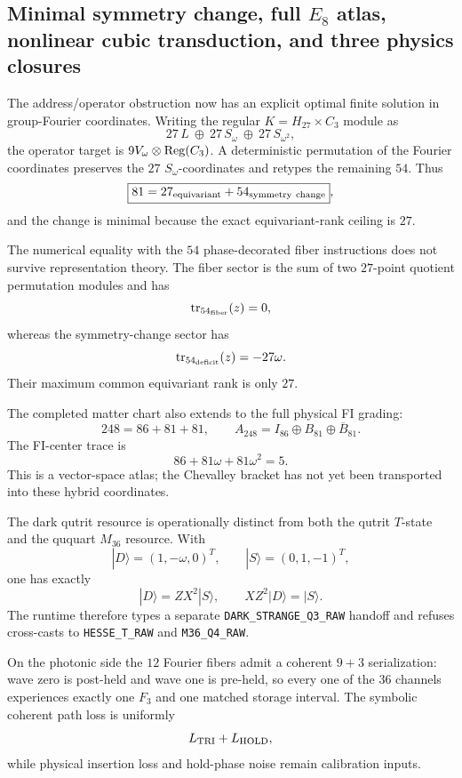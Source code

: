 \subsection*{Minimal symmetry change, full $E_8$ atlas, nonlinear cubic transduction, and three physics closures}

The address/operator obstruction now has an explicit optimal finite solution in
group-Fourier coordinates.  Writing the regular
\(K=H_{27}\times C_3\) module as
\[
27\,L\ \oplus\ 27\,S_{\omega}\ \oplus\ 27\,S_{\omega^2},
\]
the operator target is \(9V_\omega\otimes{\rm Reg}(C_3)\).  A deterministic
permutation of the Fourier coordinates preserves the \(27\)
\(S_\omega\)-coordinates and retypes the remaining \(54\).  Thus
\[
\boxed{81=27_{\rm equivariant}+54_{\rm symmetry\ change}},
\]
and the change is minimal because the exact equivariant-rank ceiling is
\(27\).

The numerical equality with the \(54\) phase-decorated fiber instructions does
not survive representation theory.  The fiber sector is the sum of two
\(27\)-point quotient permutation modules and has
\[
{\rm tr}_{54_{\rm fiber}}(z)=0,
\]
whereas the symmetry-change sector has
\[
{\rm tr}_{54_{\rm deficit}}(z)=-27\omega .
\]
Their maximum common equivariant rank is only \(27\).

The completed matter chart also extends to the full physical FI grading:
\[
\boxed{
248=86+81+81,\qquad
A_{248}=I_{86}\oplus B_{81}\oplus\overline{B}_{81}.
}
\]
The FI-center trace is
\[
86+81\omega+81\omega^2=5.
\]
This is a vector-space atlas; the Chevalley bracket has not yet been transported
into these hybrid coordinates.

The dark qutrit resource is operationally distinct from both the qutrit
\(T\)-state and the ququart \(M_{36}\) resource.  With
\[
|D\rangle=(1,-\omega,0)^T,\qquad |S\rangle=(0,1,-1)^T,
\]
one has exactly
\[
|D\rangle=ZX^2|S\rangle,\qquad XZ^2|D\rangle=|S\rangle.
\]
The runtime therefore types a separate \texttt{DARK\_STRANGE\_Q3\_RAW} handoff
and refuses cross-casts to \texttt{HESSE\_T\_RAW} and \texttt{M36\_Q4\_RAW}.

On the photonic side the \(12\) Fourier fibers admit a coherent \(9+3\)
serialization: wave zero is post-held and wave one is pre-held, so every one
of the \(36\) channels experiences exactly one \(F_3\) and one matched storage
interval.  The symbolic coherent path loss is uniformly
\[
L_{\rm TRI}+L_{\rm HOLD},
\]
while physical insertion loss and hold-phase noise remain calibration inputs.

